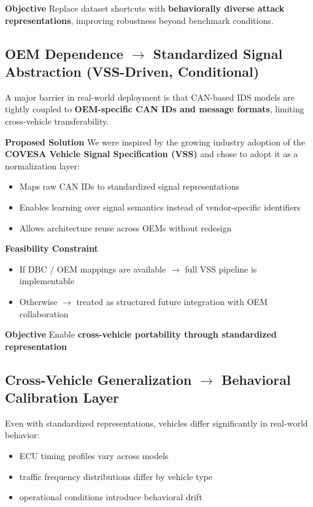 \documentclass{article}
\begin{document}
\textbf{Objective}
Replace dataset shortcuts with \textbf{behaviorally diverse attack representations}, improving robustness beyond benchmark conditions.

\subsection{OEM Dependence $\rightarrow$ Standardized Signal Abstraction (VSS-Driven, Conditional)}
A major barrier in real-world deployment is that CAN-based IDS models are tightly coupled to \textbf{OEM-specific CAN IDs and message formats}, limiting cross-vehicle transferability.

\textbf{Proposed Solution}
We were inspired by the growing industry adoption of the \textbf{COVESA Vehicle Signal Specification (VSS)} and chose to adopt it as a normalization layer:
\begin{itemize}[noitemsep]
    \item Maps raw CAN IDs to standardized signal representations
    \item Enables learning over signal semantics instead of vendor-specific identifiers
    \item Allows architecture reuse across OEMs without redesign
\end{itemize}

\textbf{Feasibility Constraint}
\begin{itemize}[noitemsep]
    \item If DBC / OEM mappings are available $\rightarrow$ full VSS pipeline is implementable
    \item Otherwise $\rightarrow$ treated as structured future integration with OEM collaboration
\end{itemize}

\textbf{Objective}
Enable \textbf{cross-vehicle portability through standardized representation}

\subsection{Cross-Vehicle Generalization $\rightarrow$ Behavioral Calibration Layer}
Even with standardized representations, vehicles differ significantly in real-world behavior:
\begin{itemize}[noitemsep]
    \item ECU timing profiles vary across models
    \item traffic frequency distributions differ by vehicle type
    \item operational conditions introduce behavioral drift
\end{itemize}
\end{document}
